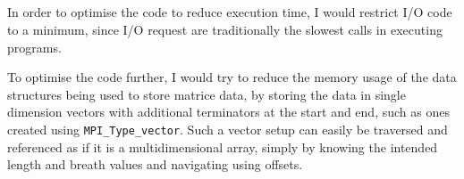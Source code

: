 \documentclass[a4paper,12pt]{article}
\begin{document}
\subsection{}

In order to optimise the code to reduce execution time, I would restrict
I/O code to a minimum, since I/O request are traditionally the slowest
calls in executing programs.


To optimise the code further, I would try to reduce the memory usage of
the data structures being used to store matrice data, by storing the
data in single dimension vectors with additional terminators at the
start and end, such as ones created using
\verb!MPI_Type_vector!. Such a vector setup can easily be traversed and
referenced as if it is a multidimensional array, simply by knowing the
intended length and breath values and navigating using offsets.
\end{document}
